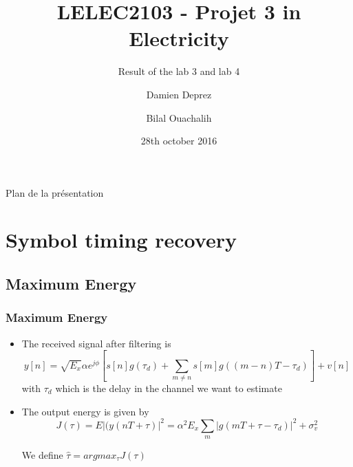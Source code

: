 \documentclass[11pt]{beamer}
\title{LELEC2103 - Projet 3 in Electricity}
\subtitle[\ldots]{Result of the lab 3 and lab 4}
\author[D. Deprez\and B. Ouachalih]{Damien Deprez\and Bilal Ouachalih}
\institute{EPL}
\date{28th october 2016}
\begin{document}
{
	\begin{frame}[noframenumbering]
		\titlepage
	\end{frame}
} 

{
	\begin{frame}[noframenumbering]{Plan de la présentation}
		\tableofcontents
	\end{frame}
}

\section{Symbol timing recovery}

\subsection{Maximum Energy}

\begin{frame}
\frametitle{Maximum Energy}

\begin{itemize}
\item The received signal after filtering is 
\begin{equation}
y[n] = \sqrt{E_x}\alpha e^{j\phi} [s[n]g(\tau_d)+\sum_{m \neq n} s[m] g((m-n)T-\tau_d)]+ v[n]
\end{equation}
with $\tau_d$ which is the delay in the channel we want to estimate

\item The output energy is given by
\begin{equation}
J(\tau) = E|(y(nT+\tau)|^2= \alpha^2 E_x \sum_m |g(mT+\tau-\tau_d)|^2 + \sigma_v ^2
\end{equation}

We define $\hat{\tau}=argmax_{\tau} J(\tau)$

\end{itemize}   

\end{frame}
\end{document}
